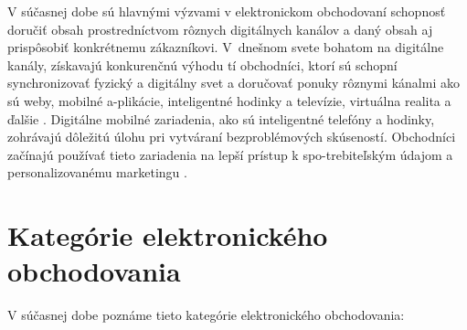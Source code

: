 \documentclass[
  printed, %
  table,   %
  lof,     %
  nolot,     %
  twoside,  
]{fithesis3}
\begin{document}
V súčasnej dobe sú hlavnými výzvami v elektronickom obchodovaní schopnosť doručiť obsah prostredníctvom rôznych digitálnych kanálov a daný obsah aj prispôsobiť konkrétnemu zákazníkovi. V~dnešnom svete bohatom na digitálne kanály, získavajú konkurenčnú výhodu tí obchodníci, ktorí sú schopní synchronizovať fyzický a digitálny svet a doručovať ponuky rôznymi kánalmi ako sú weby, mobilné a-plikácie, inteligentné hodinky a televízie, virtuálna realita a ďalšie \cite{trends1}. Digitálne mobilné zariadenia, ako sú inteligentné telefóny a hodinky, zohrávajú dôležitú úlohu pri vytváraní bezproblémových skúseností. Obchodníci začínajú používať tieto zariadenia na lepší prístup k spo-trebiteľským údajom a personalizovanému marketingu \cite{trends2}.
\newpage
\section{Kategórie elektronického obchodovania}
V súčasnej dobe poznáme tieto kategórie elektronického obchodovania:
\end{document}
